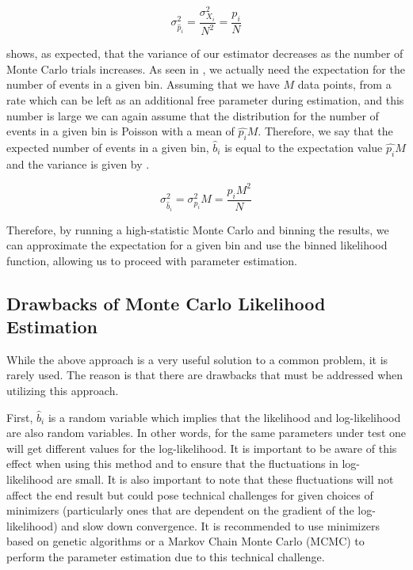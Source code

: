 \begin{equation}
        \label{eqn:gpu_prob_var}
        \sigma_{\hat{p}_i}^2 = \frac{\sigma_{X_i}^2}{N^2} = \frac{p_i}{N}
\end{equation}

 shows, as expected, that the variance of our estimator decreases as the number of Monte Carlo trials increases.  As seen in , we actually need the expectation for the number of events in a given bin.  Assuming that we have $M$ data points, from a rate which can be left as an additional free parameter during estimation, and this number is large we can again assume that the distribution for the number of events in a given bin is Poisson with a mean of $\hat{p_i} M$.  Therefore, we say that the expected number of events in a given bin, $\hat{b}_i$ is equal to the expectation value $\hat{p_i} M$ and the variance is given by .


\begin{equation}
        \label{eqn:gpu_bin_count_var}
         \sigma_{\hat{b}_i}^2 = \sigma_{p_i}^2 M = \frac{p_i M^2}{N}
\end{equation}

Therefore, by running a high-statistic Monte Carlo and binning the results, we can approximate the expectation for a given bin and use the binned likelihood function, allowing us to proceed with parameter estimation.



\subsection{Drawbacks of Monte Carlo Likelihood Estimation}


While the above approach is a very useful solution to a common problem, it is rarely used.  The reason is that there are drawbacks that must be addressed when utilizing this approach.

First, $\hat{b}_i$ is a random variable which implies that the likelihood and log-likelihood are also random variables.  In other words, for the same parameters under test one will get different values for the log-likelihood.  It is important to be aware of this effect when using this method and to ensure that the fluctuations in log-likelihood are small.  It is also important to note that these fluctuations will not affect the end result but could pose technical challenges for given choices of minimizers (particularly ones that are dependent on the gradient of the log-likelihood) and slow down convergence.  It is recommended to use minimizers based on genetic algorithms or a Markov Chain Monte Carlo (MCMC) to perform the parameter estimation due to this technical challenge.

